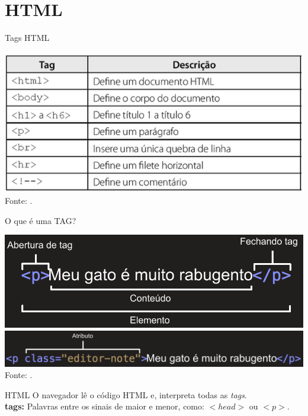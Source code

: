 \documentclass{beamer}
\begin{document}
\section{HTML}
\begin{frame}{Tags HTML}
  \begin{center}
    \includegraphics[height=0.5\paperheight]{fig/aula1/tagBasica.png}\\
    \tiny{Fonte: \cite{marinho2016}.}
   \end{center}
\end{frame}
\begin{frame}{O que é uma TAG?}
  \begin{center}
    \includegraphics[height=0.28\paperheight]{fig/aula2/aula2_tag.png}\\
    \includegraphics[height=0.13\paperheight]{fig/aula2/aula2_tag2.png}\\
    \tiny{Fonte: \cite{mdn2023}.}
   \end{center}
\end{frame}
\begin{frame}{HTML}
  O navegador lê o código HTML e, interpreta todas as \textit{tags}. \\
   \textbf{tags:} Palavras entre os sinais de maior e menor, como: 
$<head>$ ou $<p>$.
\end{frame}
\end{document}
